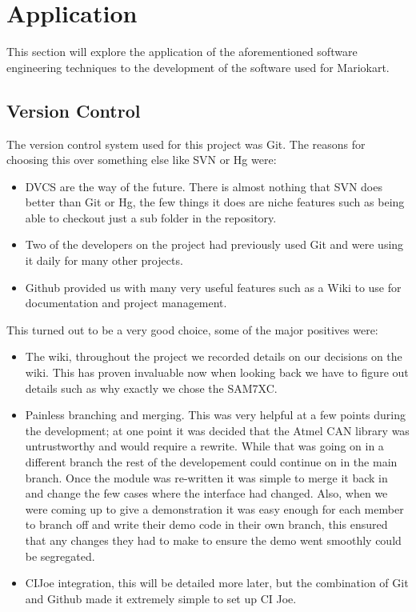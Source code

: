 \section{Application}

  This section will explore the application of the aforementioned software
  engineering techniques to the development of the software used for Mariokart.

  \subsection{Version Control}

    The version control system used for this project was Git.  The reasons for
    choosing this over something else like SVN or Hg were:

    \begin{itemize}
      \item DVCS are the way of the future.  There is almost nothing that SVN
      does better than Git or Hg, the few things it does are niche features such
      as being able to checkout just a sub folder in the repository.

      \item Two of the developers on the project had previously used Git and
      were using it daily for many other projects.

      \item Github provided us with many very useful features such as a Wiki to
      use for documentation and project management.
    \end{itemize}

    This turned out to be a very good choice, some of the major positives were:

    \begin{itemize}
      \item The wiki, throughout the project we recorded details on our
      decisions on the wiki.  This has proven invaluable now when looking back
      we have to figure out details such as why exactly we chose the SAM7XC.

      \item Painless branching and merging.  This was very helpful at a few
      points during the development; at one point it was decided that the Atmel
      CAN library was untrustworthy and would require a rewrite.  While that was
      going on in a different branch the rest of the developement could continue
      on in the main branch.  Once the module was re-written it was simple to
      merge it back in and change the few cases where the interface had changed.
      Also, when we were coming up to give a demonstration it was easy enough
      for each member to branch off and write their demo code in their own
      branch, this ensured that any changes they had to make to ensure the demo
      went smoothly could be segregated.

      \item CIJoe integration, this will be detailed more later, but the
      combination of Git and Github made it extremely simple to set up CI Joe.
    \end{itemize}

